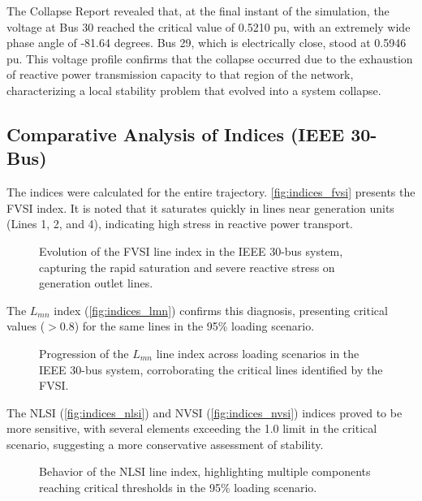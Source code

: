 \documentclass{ieeeaccess}
\begin{document}
The Collapse Report revealed that, at the final instant of the simulation, the voltage at Bus 30 reached the critical value of 0.5210 pu, with an extremely wide phase angle of -81.64 degrees. Bus 29, which is electrically close, stood at 0.5946 pu. This voltage profile confirms that the collapse occurred due to the exhaustion of reactive power transmission capacity to that region of the network, characterizing a local stability problem that evolved into a system collapse.

\subsection{Comparative Analysis of Indices (IEEE 30-Bus)}

The indices were calculated for the entire trajectory. \autoref{fig:indices_fvsi} presents the FVSI index. It is noted that it saturates quickly in lines near generation units (Lines 1, 2, and 4), indicating high stress in reactive power transport.

\begin{figure}[htbp]
    \centering
    
    \caption{Evolution of the FVSI line index in the IEEE 30-bus system, capturing the rapid saturation and severe reactive stress on generation outlet lines.}
    \label{fig:indices_fvsi}
\end{figure}

The $L_{mn}$ index (\autoref{fig:indices_lmn}) confirms this diagnosis, presenting critical values ($>0.8$) for the same lines in the 95\% loading scenario.

\begin{figure}[htbp]
    \centering
    
    \caption{Progression of the $L_{mn}$ line index across loading scenarios in the IEEE 30-bus system, corroborating the critical lines identified by the FVSI.}
    \label{fig:indices_lmn}
\end{figure}

The NLSI (\autoref{fig:indices_nlsi}) and NVSI (\autoref{fig:indices_nvsi}) indices proved to be more sensitive, with several elements exceeding the 1.0 limit in the critical scenario, suggesting a more conservative assessment of stability.

\begin{figure}[htbp]
    \centering
    
    \caption{Behavior of the NLSI line index, highlighting multiple components reaching critical thresholds in the 95\% loading scenario.}
    \label{fig:indices_nlsi}
\end{figure}
\end{document}
